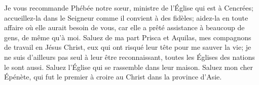 Je vous recommande Phébée notre sœur, ministre de l’Église qui est à Cencrées;
	accueillez-la dans le Seigneur comme il convient à des fidèles;
	aidez-la en toute affaire où elle aurait besoin de vous,
	car elle a prêté assistance à beaucoup de gens, de même qu’à moi.
Saluez de ma part Prisca et Aquilas, mes compagnons de travail en Jésus Christ,
	eux qui ont risqué leur tête pour me sauver la vie;
	je ne suis d’ailleurs pas seul à leur être reconnaissant,
	toutes les Églises des nations le sont aussi.
	Saluez l’Église qui se rassemble dans leur maison.
Saluez mon cher Épénète,
	qui fut le premier à croire au Christ dans la province d’Asie.

